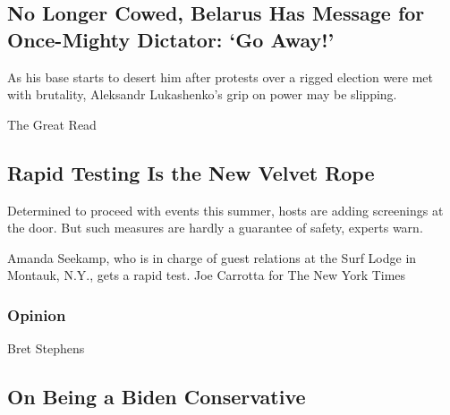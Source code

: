 \hypertarget{no-longer-cowed-belarus-has-message-for-once-mighty-dictator-go-away}{%
\subsection{No Longer Cowed, Belarus Has Message for Once-Mighty
Dictator: `Go
Away!'}\label{no-longer-cowed-belarus-has-message-for-once-mighty-dictator-go-away}}

\href{/2020/08/17/world/europe/belarus-lukashenko-protests.html}{}

As his base starts to desert him after protests over a rigged election
were met with brutality, Aleksandr Lukashenko's grip on power may be
slipping.

\href{/2020/08/16/style/does-rapid-covid-testing-work-weddings-parties.html}{}

The Great Read

\hypertarget{rapid-testing-is-the-new-velvet-rope}{%
\subsection{Rapid Testing Is the New Velvet
Rope}\label{rapid-testing-is-the-new-velvet-rope}}

Determined to proceed with events this summer, hosts are adding
screenings at the door. But such measures are hardly a guarantee of
safety, experts warn.

\href{/2020/08/16/style/does-rapid-covid-testing-work-weddings-parties.html}{}

Amanda Seekamp, who is in charge of guest relations at the Surf Lodge in
Montauk, N.Y., gets a rapid test. Joe Carrotta for The New York Times

\href{https://www.nytimes3xbfgragh.onion/section/opinion?pagetype=Homepage\&action=click\&module=Opinion}{}

\hypertarget{opinion}{%
\subsubsection{Opinion}\label{opinion}}

\href{/2020/08/17/opinion/joe-biden-conservative-2020.html}{}

Bret Stephens

\hypertarget{on-being-a-biden-conservative}{%
\subsection{On Being a Biden
Conservative}\label{on-being-a-biden-conservative}}

